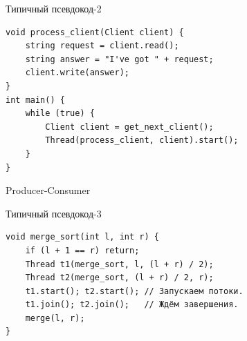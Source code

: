 \begin{frame}[fragile]{Типичный псевдокод-2}
\begin{verbatim}
void process_client(Client client) {
    string request = client.read();
    string answer = "I've got " + request;
    client.write(answer);
}
int main() {
    while (true) {
        Client client = get_next_client();
        Thread(process_client, client).start();
    }
}
\end{verbatim}
\end{frame}

\begin{frame}{Producer-Consumer}
\end{frame}

\begin{frame}[fragile]{Типичный псевдокод-3}
\begin{verbatim}
void merge_sort(int l, int r) {
    if (l + 1 == r) return;
    Thread t1(merge_sort, l, (l + r) / 2);
    Thread t2(merge_sort, (l + r) / 2, r);
    t1.start(); t2.start(); // Запускаем потоки.
    t1.join(); t2.join();   // Ждём завершения.
    merge(l, r);
}
\end{verbatim}
\end{frame}
